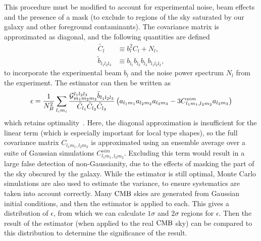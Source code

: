     This procedure must be modified to account for experimental noise, beam effects and
    the presence of a mask (to exclude to regions of the sky saturated by our galaxy
    and other foreground contaminants).
    The covariance matrix is approximated as diagonal, and the
    following quantities are defined
    \begin{align}
           \tilde{C_l} &\equiv b_l^2C_l+N_l,\\
           \tilde{b}_{l_1l_2l_3} &\equiv b_{l_1}b_{l_2}b_{l_3}b_{l_1l_2l_3},
    \end{align}
    to incorporate the experimental beam $b_l$ and the noise power
    spectrum $N_l$ from the experiment.
    The estimator can then be written as~\cite{Creminelli:2005hu, Fergusson_polyspectra, Fergusson_efficient}
    \begin{align}\label{estimator_with_linear}
        \epsilon = \frac{1}{N_B^2}\sum_{l_im_i}
        \frac{\mathcal{G}^{l_1l_2l_3}_{m_1m_2m_3}\bar{b}_{l_1l_2l_3}}{\tilde{C}_{l_1}\tilde{C}_{l_2}\tilde{C}_{l_3}}
        \left(a_{l_1m_1}a_{l_2m_2}a_{l_3m_3}-3C^{sim}_{l_1m_1,l_2m_2}a_{l_3m_3}\right)
    \end{align}
    which retains optimality~\cite{Creminelli:2005hu}.
    Here, the diagonal approximation is insufficient for the linear term
    (which is especially important for local type shapes), so the
    full covariance matrix $C_{l_1m_1,l_2m_2}$ is approximated using an ensemble average
    over a suite of Gaussian simulations $C^{sim}_{l_1m_1,l_2m_2}$. Excluding this term would result in a large false
    detection of non-Gaussianity, due to the effects of masking the part of the sky obscured
    by the galaxy. While the estimator is still optimal,
    Monte Carlo simulations are also used to estimate the variance, to ensure systematics
    are taken into account correctly.
    Many $\text{CMB}$ skies are generated from Gaussian initial conditions, and then the estimator
    is applied to each. This gives a distribution of $\epsilon$, from which we can
    calculate $1\sigma$ and $2\sigma$ regions for $\epsilon$. Then the result of the
    estimator (when applied to the real $\text{CMB}$ sky) can be compared to this distribution
    to determine the significance of the result.




